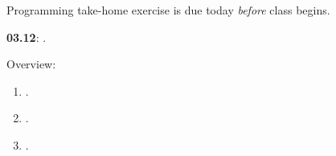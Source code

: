 \documentclass[letterpaper]{article}
\renewenvironment{itemize}{
  \begin{list}{}{
    \setlength{\leftmargin}{1.5em}
  }
}{
  \end{list}
}
\begin{document}
\begin{enumerate}
\begin{itemize}
\begin{enumerate}


            
         \end{enumerate}

       
           \item[{\color{red}$\diamond$}] {\color{red}Programming take-home exercise is due today \emph{before} class begins}.

      \end{itemize}

\item {\bf 03.12}:  {\color{ForestGreen}{\bf Ethics}}.


      \begin{itemize} 

        \item[$\diamond$] Overview:

        \begin{enumerate}

          \item[$\bullet$] \href{https://doi.org/10.1017/CBO9780511762888.011}{}.

          \item[$\bullet$] \href{https://doi.org/10.1017/CBO9780511762888.012}{}.

          \item[$\bullet$] \href{https://doi.org/10.1017/CBO9780511762888.013}{}.

          \end{enumerate}

   
      \end{itemize}

\end{enumerate}


\printbibliography

\end{document}
